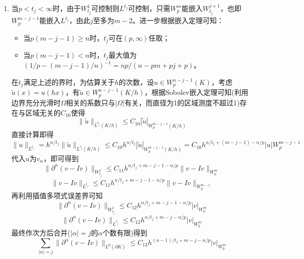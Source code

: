 \documentclass[a4paper,UTF8,fontset=windows,10pt]{ctexart}
\begin{document}
\begin{enumerate}
\begin{enumerate}
        \item 当$p<t_j<\infty$时，由于$W_{t_j}^1$可控制则$L^{t_j}$可控制，只需$W_p^m$能嵌入$W_{t_j}^{j+1}$，也即$W_p^{m-j-1}$能嵌入$L^{t_j}$，由此$j$至多为$m-2$。进一步根据嵌入定理可知：
        \begin{itemize}
            \item 当$p(m-j-1)\ge n$时，$t_j$可在$(p,\infty)$任取；
            \item 当$p(m-j-1)<n$时，$t_j$最大值为$(1/p-(m-j-1)/n)^{-1}=np/(n-pm+pj+p)$。
        \end{itemize}
    
        在$t_j$满足上述的界时，为估算关于$h$的次数，设$u\in W_p^{n-j-1}(K)$，考虑$\tilde{u}(x)=u(hx)$，有$\tilde{u}\in W_p^{n-j-1}(K/h)$，根据Sobolev嵌入定理可知(利用边界充分光滑时$\Omega$相关的系数只与$|\Omega|$有关，而直径为1的区域测度不超过1)存在与区域无关的$C_{10}$使得
        $$\|\tilde{u}\|_{L^{t_j}(K/h)}\le C_{10}|\tilde{u}|_{W_p^{m-j-1}(K/h)}$$
        直接计算即得
        $$\|u\|_{L^{t_j}}=h^{n/t_j}\|\tilde{u}\|_{L^{t_j}(K/h)}\le C_{10}h^{n/t_j}|\tilde{u}|_{W_p^{m-j-1}(K/h)}=C_{10}h^{n/t_j+(m-j-1)-n/p}|u|W_p^{m-j-1}$$
        代入$u$为$v_\alpha$，即可得到
        $$\|\partial^\alpha(v-Iv)\|_{W_{t_j}^1}\le C_{11}h^{n/t_j+m-j-1-n/p}\|v-Iv\|_{W_p^m}$$
        $$\|v-Iv\|_{L^{t_j}}\le C_{11}h^{n/t_j+m-j-1-n/p}\|v-Iv\|_{W_p^{m-1}}$$
        再利用插值多项式误差界可知
        $$\|\partial^\alpha(v-Iv)\|_{W_{t_j}^1}\le C_{12}h^{n/t_j+m-j-1-n/p}|v|_{W_p^m}$$
        $$\|\partial^\alpha(v-Iv)\|_{L^{t_j}}\le C_{12}h^{n/t_j+m-j-n/p}|v|_{W_p^m}$$
        最终作次方后合并($|\alpha|=j$的$\alpha$个数有限)得到
        $$\sum_{|\alpha|=j}\|\partial^\alpha(v-Iv)\|_{L^p(\partial K)}\le C_{13}h^{(n-1)/t_j+m-j-n/p}|v|_{W_p^m}$$
    \end{enumerate}
\end{enumerate}
\end{document}
